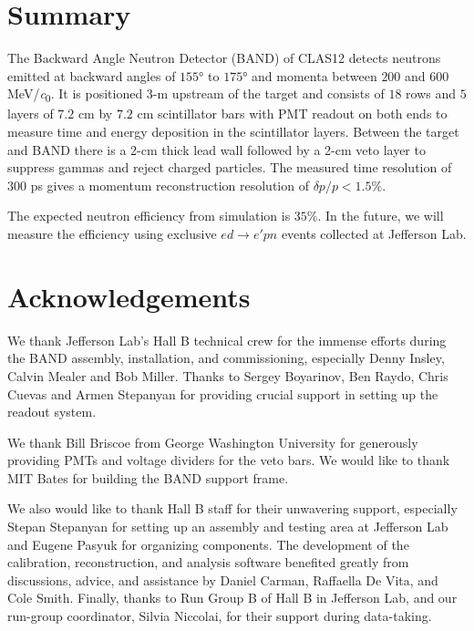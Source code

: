 \documentclass[3p,twocolumn]{elsarticle}
\begin{document}
\section{Summary}
The Backward Angle Neutron Detector (BAND) of CLAS12 detects neutrons
  emitted at backward angles of $155$\si{\degree} to $175$\si{\degree}
  and momenta between $200$ and $600$ \si{\MeV/\clight}. It is
  positioned 3-\si{\meter} upstream of the target and consists of $18$
  rows and $5$ layers of $7.2$ \si{\centi\meter} by $7.2$
  \si{\centi\meter} scintillator bars with PMT readout on both ends to
  measure time and energy deposition in the scintillator
  layers. Between the target and BAND there is a 2-\si{\centi\meter}
  thick lead wall followed by a 2-\si{\centi\meter} veto layer to
  suppress gammas and reject charged particles. The measured time
  resolution of 300 ps gives a momentum
  reconstruction resolution of $\delta p/p < 1.5$\%.
 

The expected neutron efficiency from simulation is $35$\%. In the
future, we will measure the efficiency using exclusive $ed \rightarrow e'pn$
events collected at Jefferson Lab.


\section*{Acknowledgements}
We thank Jefferson Lab's Hall B technical crew for the immense efforts during the BAND assembly, installation, and commissioning, especially Denny Insley, Calvin Mealer and Bob Miller. Thanks to Sergey Boyarinov, Ben Raydo, Chris Cuevas and Armen Stepanyan for providing crucial support in setting up the readout system.

We thank Bill Briscoe from George Washington University for generously providing PMTs and voltage dividers for the veto bars. We would like to thank MIT Bates for building the BAND support frame. 

We also would like to thank Hall B staff for their unwavering support, especially Stepan Stepanyan for setting up an assembly and testing area at Jefferson Lab and Eugene Pasyuk for organizing components. The development of the calibration, reconstruction, and analysis software benefited greatly from discussions, advice, and assistance by Daniel Carman, Raffaella De Vita, and Cole Smith. Finally, thanks to Run Group B of Hall B in Jefferson Lab, and our run-group coordinator, Silvia Niccolai, for their support during data-taking.
\end{document}
